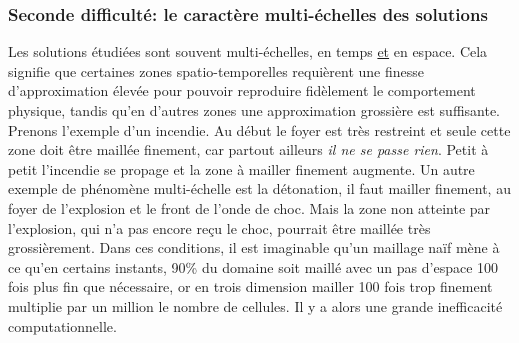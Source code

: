     \subsubsection{Seconde difficulté: le caractère multi-échelles des solutions}
        Les solutions étudiées sont souvent multi-échelles, en temps \underline{et} en espace. Cela signifie que certaines zones spatio-temporelles requièrent
        une finesse d'approximation élevée pour pouvoir reproduire fidèlement le comportement physique, tandis qu'en d'autres zones une approximation
        grossière est suffisante. Prenons l'exemple d'un incendie. Au début le foyer est très restreint et seule cette zone doit être maillée finement, 
        car partout ailleurs \textit{il ne se passe rien}. Petit à petit l'incendie se propage et la zone à mailler finement augmente. Un autre exemple de phénomène 
        multi-échelle est la détonation, il faut mailler finement, au foyer de l'explosion et le front de l'onde de choc. Mais la zone non atteinte par l'explosion, 
        qui n'a pas encore reçu le choc, pourrait être maillée très grossièrement. 
        Dans ces conditions, il est imaginable qu'un maillage naïf mène à ce qu'en certains instants, 90\% du domaine soit maillé avec un pas d'espace 100 fois plus fin que nécessaire,
        or en trois dimension mailler 100 fois trop finement multiplie par un million le nombre de cellules.
        Il y a alors une grande inefficacité computationnelle.



